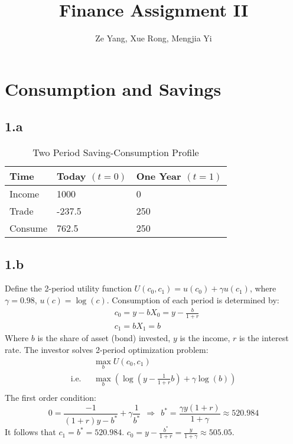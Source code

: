 \documentclass[10 pt]{hwtemplate} %
\title{\textbf{Finance Assignment II}}
\author{Ze Yang, Xue Rong, Mengjia Yi}
\begin{document}
\maketitle


\section{Consumption and Savings}
\subsection*{1.a}
\begin{table}[htbp]
  \begin{center}
  \captionsetup{justification=centering}
  \caption{\label{tab:twoprd}Two Period Saving-Consumption Profile}
    \begin{tabular}{lC{4cm}C{4cm}}
    \toprule
    Time &  Today $(t=0)$ & One Year $(t=1)$ \\
    \midrule
    Income & 1000 & 0 \\
    Trade & -237.5 & 250 \\
    \midrule
    Consume & 762.5 & 250 \\
    \bottomrule
    \end{tabular}
  \end{center}
\end{table}
\subsection*{1.b} Define the 2-period utility function $U(c_0, c_1) = u(c_0) + \gamma u(c_1)$, where $\gamma = 0.98$, $u(c)=\log(c)$. Consumption of each period is determined by:
\begin{equation}
  \begin{split}
    &c_0 = y - b X_0  = y- \frac{b}{1+r}\\
    &c_1 = b X_1 = b
  \end{split}
\end{equation}
Where $b$ is the share of asset (bond) invested, $y$ is the income, $r$ is the interest rate.
The investor solves 2-period optimization problem:
\begin{equation}
  \begin{split}
    &\max\limits_{b} U(c_0, c_1)\\
    \text{i.e.~~}  &\max\limits_{b} \left(\log(y-\tfrac{1}{1+r}b) + \gamma \log(b)\right) \\
  \end{split}
\end{equation}
The first order condition:
$$
0 = \frac{-1}{(1+r)y-b^*} + \gamma \frac{1}{b^*}~~\Rightarrow~~b^* = \frac{\gamma y(1+r)}{1+\gamma} \approx 520.984
$$
It follows that $c_1= b^*= 520.984$. $c_0=y-\tfrac{b^*}{1+r}=\frac{y}{1+\gamma}\approx505.05$.
\end{document}
